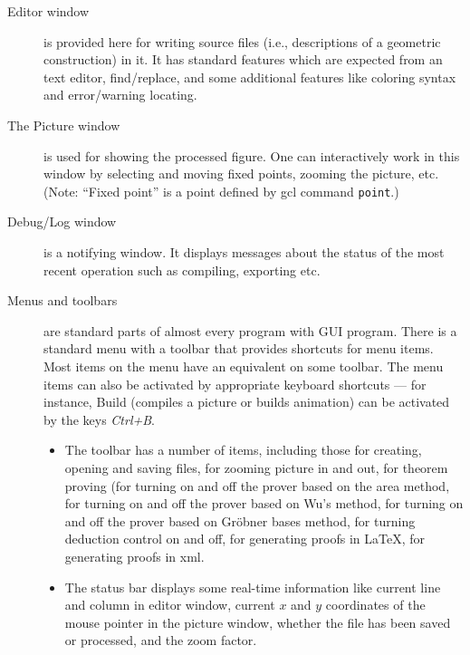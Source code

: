 \documentclass[a4paper]{book}
\begin{document}
\begin{description}
\item[Editor window] is provided here for writing source files (i.e.,
descriptions of a geometric construction) in it. It has standard
features which are expected from an text editor, find/replace, and
some additional features like coloring syntax and error/warning locating.

\item[The Picture window] is used for showing the processed figure.
One can interactively work in this window by selecting and moving 
fixed points, zooming the picture, etc.
(Note: ``Fixed point'' is a point defined by {\sc gcl} command \verb|point|.)

\item[Debug/Log window] is a notifying window. It displays messages
about the status of the most recent operation such as compiling,
exporting etc.

\item[Menus and toolbars] are standard parts of almost every program with 
GUI program. There is a standard menu with a toolbar that provides shortcuts 
for menu items. Most items on the menu have an equivalent on some toolbar. 
The menu items can also be activated by appropriate keyboard shortcuts ---
for instance, Build (compiles a picture or builds animation) can be 
activated by the keys {\it Ctrl+B}.

\begin{itemize}
\item The toolbar has a number of items, including those for
creating, opening and saving files, 
for zooming picture in and out, for theorem proving 
(for turning on and off the prover based on the area method,
for turning on and off the prover based on Wu's method,
for turning on and off the prover based on Gröbner bases method, 
for turning deduction control on and off,
for generating proofs in \LaTeX{}, 
for generating proofs in {\sc xml}.


\item The status bar displays some real-time information like
current line and column in editor window, current $x$ and $y$ coordinates of
the mouse pointer in the picture window, whether the file has been saved
or processed, and the zoom factor.
\end{itemize}

\end{description}
\end{document}
